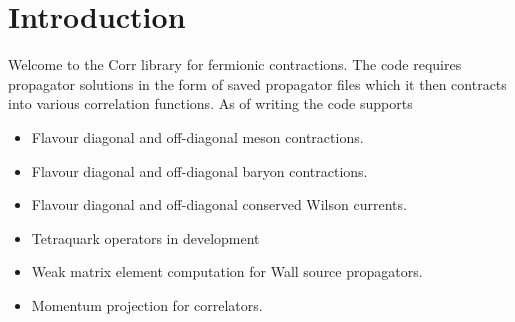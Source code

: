 \section{Introduction}

Welcome to the Corr library for fermionic contractions. 
The code requires propagator solutions in the form of saved
propagator files which it then contracts into various
correlation functions. As of writing the code supports

\begin{itemize}
\item Flavour diagonal and off-diagonal meson contractions.
\item Flavour diagonal and off-diagonal baryon contractions.
\item Flavour diagonal and off-diagonal conserved Wilson currents.
\item Tetraquark operators in development
\item Weak matrix element computation for Wall source propagators.
\item Momentum projection for correlators.
\end{itemize}
